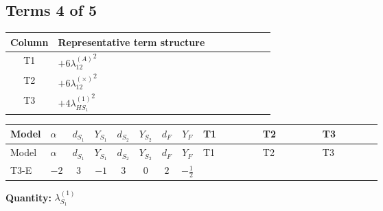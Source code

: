 \documentclass[8pt]{article}
\begin{document}
\begin{landscape}
\subsection*{Terms 4 of 5}
\begin{center}
\begin{tabular}{@{}c >{\raggedright\arraybackslash}p{0.82\linewidth}@{}}
\toprule
Column & Representative term structure \\
\midrule
T1 & \(\displaystyle +6 {\lambda_{12}^{(A)}}^2\) \\
\midrule
T2 & \(\displaystyle +6 {\lambda_{12}^{(\times)}}^2\) \\
\midrule
T3 & \(\displaystyle +4 {\lambda_{HS_1}^{(1)}}^2\) \\
\midrule
\bottomrule
\end{tabular}
\end{center}
\smallskip
\tiny
\begin{longtable}{@{}llcccccc >{\raggedright\arraybackslash}p{0.21\linewidth} >{\raggedright\arraybackslash}p{0.21\linewidth} >{\raggedright\arraybackslash}p{0.21\linewidth}@{}}
\toprule
Model & $\alpha$ & $d_{S_1}$ & $Y_{S_1}$ & $d_{S_2}$ & $Y_{S_2}$ & $d_F$ & $Y_F$ & T1 & T2 & T3 \\
\midrule
\endfirsthead
\toprule
Model & $\alpha$ & $d_{S_1}$ & $Y_{S_1}$ & $d_{S_2}$ & $Y_{S_2}$ & $d_F$ & $Y_F$ & T1 & T2 & T3 \\
\midrule
\endhead
T3-E & $-2$ & $3$ & $-1$ & $3$ & $0$ & $2$ & $-\frac{1}{2}$ & \scriptsize\adjustbox{max width=\linewidth}{$\begin{gathered} +6 {\lambda_{12}^{(A)}}^2\end{gathered}$} & \scriptsize\adjustbox{max width=\linewidth}{$\begin{gathered} +6 {\lambda_{12}^{(\times)}}^2\end{gathered}$} & \scriptsize\adjustbox{max width=\linewidth}{$\begin{gathered} +4 {\lambda_{HS_1}^{(1)}}^2\end{gathered}$} \\
\midrule
\bottomrule
\end{longtable}
\clearpage
\noindent\textbf{Quantity: }$\lambda_{S_1}^{(1)}$\par\smallskip

\end{landscape}
\end{document}
